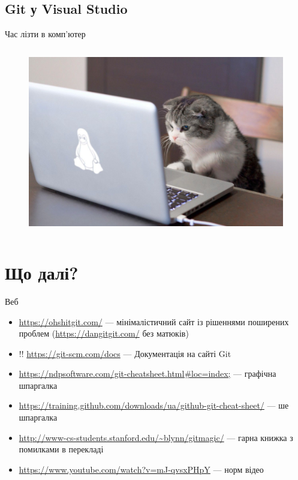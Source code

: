 \documentclass[
  ignorenonframetext,
  aspectratio=169,
]{beamer}
\providecommand{\tightlist}{%
  \setlength{\itemsep}{0pt}\setlength{\parskip}{0pt}}
\begin{document}
\hypertarget{git-ux443-visual-studio}{%
\subsection{Git у Visual Studio}\label{git-ux443-visual-studio}}

\begin{frame}{Час лізти в комп'ютер}
\protect\hypertarget{ux447ux430ux441-ux43bux456ux437ux442ux438-ux432-ux43aux43eux43cux43fux44eux442ux435ux440}{}
\begin{columns}
\begin{figure}
    \includegraphics[width=\textwidth]{images/cat.jpg}
\end{figure}
\end{columns}
\end{frame}

\hypertarget{ux449ux43e-ux434ux430ux43bux456}{%
\section{Що далі?}\label{ux449ux43e-ux434ux430ux43bux456}}

\begin{frame}{Веб}
\protect\hypertarget{ux432ux435ux431}{}
\begin{itemize}
\tightlist
\item
  \url{https://ohshitgit.com/} --- мінімалістичний сайт із рішеннями
  поширених проблем (\url{https://dangitgit.com/} без матюків)
\item
  !! \url{https://git-scm.com/docs} --- Документація на сайті Git
\item
  \url{https://ndpsoftware.com/git-cheatsheet.html\#loc=index;} ---
  графічна шпаргалка
\item
  \url{https://training.github.com/downloads/ua/github-git-cheat-sheet/}
  --- ше шпаргалка
\item
  \url{http://www-cs-students.stanford.edu/~blynn/gitmagic/} --- гарна
  книжка з помилками в перекладі
\item
  \url{https://www.youtube.com/watch?v=mJ-qvsxPHpY} --- норм відео
\end{itemize}
\end{frame}
\end{document}

